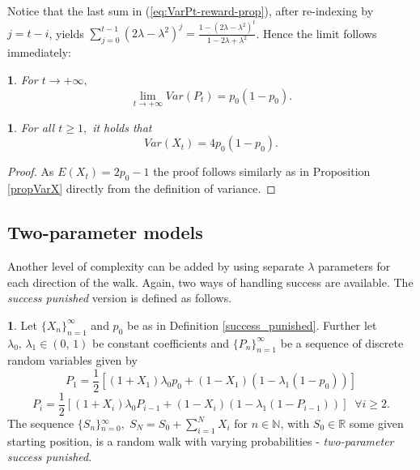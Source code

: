 \documentclass{amsart}
\theoremstyle{definition}
\newtheorem{defn}[thm]{\protect\definitionname}
\theoremstyle{plain}
\newtheorem{prop}[thm]{\protect\propositionname}
\theoremstyle{plain}
\newtheorem{cor}[thm]{\protect\corollaryname}
\theoremstyle{plain}
\numberwithin{equation}{section}
\providecommand{\corollaryname}{Corollary}
\providecommand{\definitionname}{Definition}
\providecommand{\propositionname}{Proposition}
\begin{document}
Notice that the last sum in (\ref{eq:VarPt-reward-prop}), after re-indexing
by $j=t-i$, yields $\sum_{j=0}^{t-1}(2\lambda-\lambda^{2})^{j}=\frac{1-(2\lambda-\lambda^{2})^{t}}{1-2\lambda+\lambda^{2}}$.
Hence the limit follows immediately:

\begin{cor}
For $t\rightarrow+\infty,$ \textup{
\[
\lim_{t\to+\infty}Var(P_{t})=p_{0}(1-p_{0}).
\]
}
\end{cor}

\begin{prop}
For all $t\geq1,$ it holds that
\begin{equation}
Var(X_{t})=4p_0(1-p_0).
\end{equation}
\end{prop}
\begin{proof}
As $E(X_t)=2p_0-1$ the proof follows similarly as in Proposition \ref{propVarX} directly from the definition of variance.
\end{proof}



\subsection{Two-parameter models}

Another level of complexity can be added by using separate $\lambda$
parameters for each direction of the walk. Again, two ways of handling
success are available. The \emph{success punished} version is defined
as follows.

\begin{defn}
\label{2lambdas}Let ${\{X_{n}\}}_{n=1}^{\infty}$ and $p_{0}$ be
as in Definition \ref{success_punished}. Further let $\lambda_{0},\,\lambda_{1}\in(0,\,1)$
be constant coefficients and ${\{P_{n}\}}_{n=1}^{\infty}$ be a sequence
of discrete random variables given by
\begin{equation}
P_{1}=\frac{1}{2}[(1+X_{1})\lambda_{0}p_{0}+(1-X_{1})(1-\lambda_{1}(1-p_{0}))]\label{eq:P!1_def-1-1}
\end{equation}
\begin{equation}
P_{i}=\frac{1}{2}[(1+X_{i})\lambda_{0}P_{i-1}+(1-X_{i})(1-\lambda_{1}(1-P_{i-1}))]\;\;\forall i\geq2.\label{eq:Pi_def-1-1}
\end{equation}
The sequence ${\{S_{n}\}}{}_{n=0}^{\infty},\;S_{N}=S_{0}+\sum_{i=1}^{N}X_{i}$
for $n\in\mathbb{N}$, with $S_{0}\in\mathbb{R}$ some given starting
position, is a random walk with varying probabilities - \emph{two-parameter success
punished}.
\end{defn}
\end{document}
